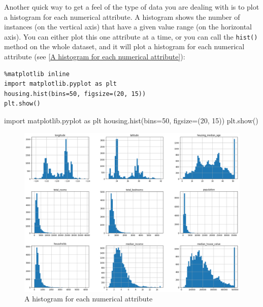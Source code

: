 Another quick way to get a feel of the type of data you are dealing with is to plot a
histogram for each numerical attribute. A histogram shows the number of instances
(on the vertical axis) that have a given value range (on the horizontal axis). You can
either plot this one attribute at a time, or you can call the \verb|hist()| method on the whole dataset, and it will plot a histogram
for each numerical attribute (see \autoref{A histogram for each numerical attribute}):
\begin{verbatim}
%matplotlib inline
import matplotlib.pyplot as plt
housing.hist(bins=50, figsize=(20, 15))
plt.show()
\end{verbatim}

\begin{pyc}
import matplotlib.pyplot as plt
housing.hist(bins=50, figsize=(20, 15))
plt.show()
\end{pyc}

\begin{figure}
\centering
\includegraphics{img/codes/A histogram for each numerical attribute.png}
\caption{A histogram for each numerical attribute}
\label{A histogram for each numerical attribute}
\end{figure}


